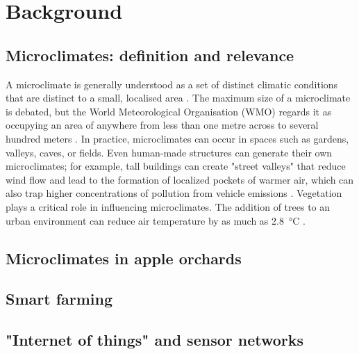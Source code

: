 \section{Background}

\subsection{Microclimates: definition and relevance}

A microclimate is generally understood as a set of distinct climatic conditions
that are distinct to a small, localised area \cite{MetOffice2023}. The maximum
size of a microclimate is debated, but the World Meteorological Organisation
(WMO) regards it as occupying an area of anywhere from less than one metre
across to several hundred meters \cite{wmo2024}.  In practice, microclimates can
occur in spaces such as gardens, valleys, caves, or fields. Even human-made
structures can generate their own microclimates; for example, tall buildings can
create "street valleys" that reduce wind flow and lead to the formation of
localized pockets of warmer air, which can also trap higher concentrations of
pollution from vehicle emissions \cite{yang2023}. Vegetation plays a critical
role in influencing microclimates. The addition of trees to an urban environment
can reduce air temperature by as much as \SI{2.8}{\degreeCelsius}
\cite{lai2019}.



\subsection{Microclimates in apple orchards}

\subsection{Smart farming}

\subsection{"Internet of things" and sensor networks}

